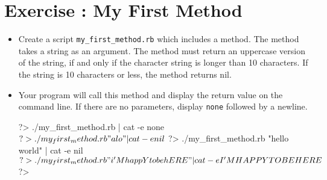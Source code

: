 \documentclass{42-en}
\begin{document}

\startexercices



\chapter{Exercise \exercicenumber: My First Method}

\exnumber{\exercicenumber}

\makeheaderfiles

\begin{itemize}

\item Create a script \texttt{my\_first\_method.rb} which includes a method. The method takes a string as an argument. The method must return an uppercase version of the string, if and only if the character string is longer than 10 characters. If the string is 10 characters or less, the method returns nil.
\item Your program will call this method and display the return value on the command line. If there are no parameters, display \texttt{none} followed by a newline.

\begin{42console}
	?> ./my_first_method.rb | cat -e
	none$
	?> ./my_first_method.rb "alo" | cat -e
	nil$
	?> ./my_first_method.rb "hello world" | cat -e
	nil$
	?> ./my_first_method.rb "i'M happY to be hERE" | cat -e
	I'M HAPPY TO BE HERE$
	?>
\end{42console}

\end{itemize}



\end{document}
